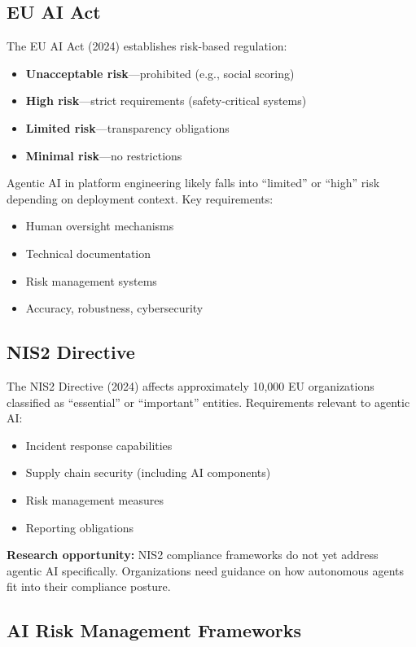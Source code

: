 \subsection{EU AI Act}
\label{subsec:eu-ai-act}

The EU AI Act (2024) establishes risk-based regulation:
\begin{itemize}
    \item \textbf{Unacceptable risk}---prohibited (e.g., social scoring)
    \item \textbf{High risk}---strict requirements (safety-critical systems)
    \item \textbf{Limited risk}---transparency obligations
    \item \textbf{Minimal risk}---no restrictions
\end{itemize}

Agentic AI in platform engineering likely falls into ``limited'' or ``high'' risk depending on deployment context. Key requirements:
\begin{itemize}
    \item Human oversight mechanisms
    \item Technical documentation
    \item Risk management systems
    \item Accuracy, robustness, cybersecurity
\end{itemize}

\subsection{NIS2 Directive}
\label{subsec:nis2}

The NIS2 Directive (2024) affects approximately 10,000 EU organizations classified as ``essential'' or ``important'' entities. Requirements relevant to agentic AI:
\begin{itemize}
    \item Incident response capabilities
    \item Supply chain security (including AI components)
    \item Risk management measures
    \item Reporting obligations
\end{itemize}

\textbf{Research opportunity:} NIS2 compliance frameworks do not yet address agentic AI specifically. Organizations need guidance on how autonomous agents fit into their compliance posture.

\subsection{AI Risk Management Frameworks}
\label{subsec:risk-frameworks}

